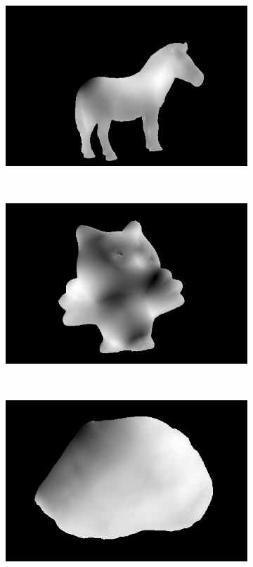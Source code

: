 \documentclass{paper}
\begin{document}
\begin{figure}[h!]
\begin{subfigure}{0.3\textwidth}
        \end{subfigure}
        \begin{subfigure}{0.3\textwidth}
                \includegraphics[width=\textwidth]{report_fig/horse_d}
        \end{subfigure}
        ~ 
        \begin{subfigure}{0.3\textwidth}
                \includegraphics[width=\textwidth]{report_fig/owl_d}
        \end{subfigure}
        ~ 
        \begin{subfigure}{0.3\textwidth}
                \includegraphics[width=\textwidth]{report_fig/rock_d}

\end{subfigure}
\end{figure}
\end{document}
